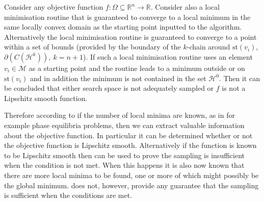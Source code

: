 \begin{corollary} \label{corollary:smooth}
Consider any objective function $f : \Omega \subseteq \mathbb{R}^n \rightarrow \mathbb{R}$. Consider also a local minimisation routine that is guaranteed to converge to a local minimum in the same locally convex domain as the starting point inputted to the algorithm. Alternatively the local minimisation routine is guaranteed to converge to a point within a set of bounds (provided by the boundary of the $k$-chain around $\textrm{st}\left( v_i \right)$,  $\partial \left( C(\mathcal{H}^k) \right), ~k = n + 1$). If such a local minimisation routine  uses an element $v_i \in \mathcal{M}$ as a starting point and the routine leads to a minimum outside or on $\textrm{st}\left(v_{i}\right)$ and in addition the minimum is not contained in the set $\mathcal{H}^0$. Then it can be concluded that either search space is not adequately sampled or $f$ is not a Lipschitz smooth function.
\end{corollary}
Therefore according to  if the number of local minima are known, as in for example phase equilibria problems, then we can extract valuable information about the objective function. In particular it can be determined whether or not the objective function is Lipschitz smooth. Alternatively if the function is known to be Lipschitz smooth then  can be used to prove the sampling is insufficient when the condition is not met. When this happens it is also now known that there are more local minima to be found, one or more of which might possibly be the global minimum.  does not, however, provide any guarantee that the sampling is sufficient when the conditions are met.
